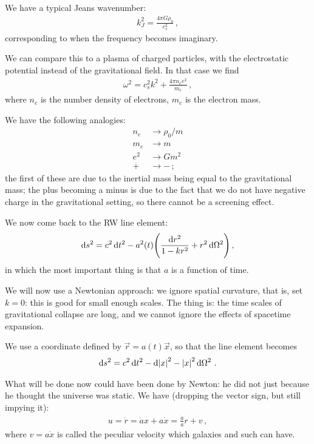\documentclass[main.tex]{subfiles}
\begin{document}

We have a typical Jeans wavenumber: 
%
\begin{align}
  k_J^2 = \frac{4 \pi G \rho_0 }{c_s^2}
\,,
\end{align}
%
corresponding to when the frequency becomes imaginary. 

We can compare this to a plasma of charged particles, with the electrostatic potential instead of the gravitational field. 
In that case we find 
%
\begin{align}
  \omega^2 = c_s^2 k^2 + \frac{4 \pi n_e e^2}{m_e}
\,,
\end{align}
%
where \(n_e\) is the number density of electrons, \(m_e\) is the electron mass. 

We have the following analogies: 
%
\begin{subequations}
\begin{align}
  n_e &\rightarrow \rho_0 / m  \\
  m_e &\rightarrow m  \\
  e^2 &\rightarrow Gm^2  \\
  + &\rightarrow -
\,;
\end{align}
\end{subequations}
%
the first of these are due to the inertial mass being equal to the gravitational mass; the plus becoming a minus is due to the fact that we do not have negative charge in the gravitational setting, so there cannot be a screening effect. 

We now come back to the RW line element: 
%
\begin{align}
  \dd{s^2} = c^2 \dd{t^2} 
  -a^2(t) \qty(\frac{ \dd{r^2}}{1 - kr^2} + r^2 \dd{\Omega^2})
\,,
\end{align}
%
in which the most important thing is that \(a\) is a function of time. 

We will now use a Newtonian approach: we ignore spatial curvature, that is, set \(k=0\): this is good for small enough scales. The thing is: the time scales of gravitational collapse are long, and we cannot ignore the effects of spacetime expansion. 

We use a coordinate defined by \(\vec{r} = a(t) \vec{x}\), so that the line element becomes 
%
\begin{align}
  \dd{s^2} = c^2 \dd{t^2} - \dd{\abs{x}^2} - 
\abs{x}^2 \dd{\Omega^2}
\,. 
\end{align}
%

What will be done now could have been done by Newton: he did not just because he thought the universe was static. We have (dropping the vector sign, but still impying it): 
%
\begin{align}
  u = \dot{r} = \dot{a} x + a \dot{x} 
  = \frac{\dot{a}}{a} r + v
\,,
\end{align}
%
where \(v = a \dot{x}\) is called the peculiar velocity which galaxies and such can have.  
\end{document}
